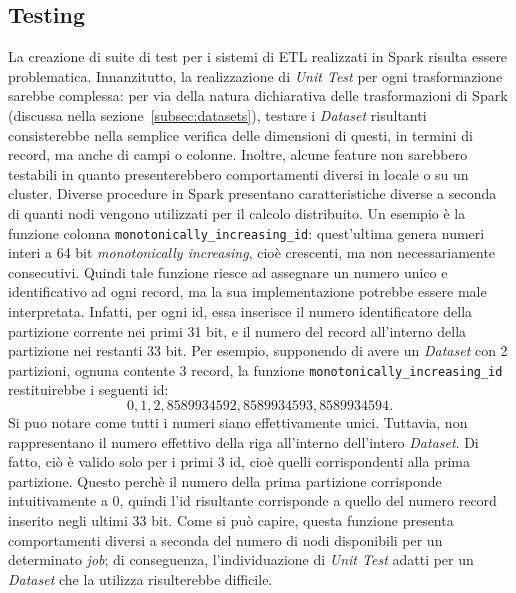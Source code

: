 \subsection{Testing}\label{subsec:testing}
La creazione di suite di test per i sistemi di ETL realizzati in Spark risulta essere problematica.
Innanzitutto, la realizzazione di \textit{Unit Test} per ogni trasformazione sarebbe complessa:
per via della natura dichiarativa delle trasformazioni di Spark (discussa nella sezione~\ref{subsec:datasets}), testare i \textit{Dataset} risultanti consisterebbe nella semplice verifica delle dimensioni di questi, in termini di record, ma anche di campi o colonne.
Inoltre, alcune feature non sarebbero testabili in quanto presenterebbero comportamenti diversi in locale o su un cluster.
Diverse procedure in Spark presentano caratteristiche diverse a seconda di quanti nodi vengono utilizzati per il calcolo distribuito.
Un esempio è la funzione colonna \texttt{monotonically\_increasing\_id}:
quest'ultima genera numeri interi a 64 bit \textit{monotonically increasing}, cioè crescenti, ma non necessariamente consecutivi.
Quindi tale funzione riesce ad assegnare un numero unico e identificativo ad ogni record, ma la sua implementazione potrebbe essere male interpretata.
Infatti, per ogni id, essa inserisce il numero identificatore della partizione corrente nei primi 31 bit, e il numero del record all'interno della partizione nei restanti 33 bit.
Per esempio, supponendo di avere un \textit{Dataset} con 2 partizioni, ognuna contente 3 record, la funzione \texttt{monotonically\_increasing\_id} restituirebbe i seguenti id:
\[0, 1, 2, 8589934592, 8589934593, 8589934594.\]
Si puo notare come tutti i numeri siano effettivamente unici.
Tuttavia, non rappresentano il numero effettivo della riga all'interno dell'intero \textit{Dataset}.
Di fatto, ciò è valido solo per i primi 3 id, cioè quelli corrispondenti alla prima partizione.
Questo perchè il numero della prima partizione corrisponde intuitivamente a 0, quindi l'id risultante corrisponde a quello del numero record inserito negli ultimi 33 bit.
Come si può capire, questa funzione presenta comportamenti diversi a seconda del numero di nodi disponibili per un determinato \textit{job};
di conseguenza, l'individuazione di \textit{Unit Test} adatti per un \textit{Dataset} che la utilizza risulterebbe difficile.

